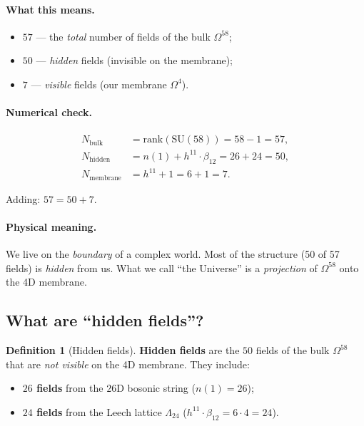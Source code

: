 \documentclass[11pt,a4paper]{article}
\newcommand{\SU}{\mathrm{SU}}
\newcommand{\Om}{\Omega^4}
\newcommand{\Omfi}{\Omega^{58}}
\newcommand{\Nbulk}{N_{\text{bulk}}}
\newcommand{\Nhidden}{N_{\text{hidden}}}
\newcommand{\Nmembrane}{N_{\text{membrane}}}
\theoremstyle{definition}
\newtheorem{definition}[theorem]{Definition}
\begin{document}
\paragraph{What this means.}
\begin{itemize}
    \item $57$ — the \emph{total} number of fields of the bulk $\Omfi$;
    \item $50$ — \emph{hidden} fields (invisible on the membrane);
    \item $7$ — \emph{visible} fields (our membrane $\Om$).
\end{itemize}

\paragraph{Numerical check.}
\begin{align}
    \Nbulk &= \mathrm{rank}(\SU(58)) = 58 - 1 = 57, \\
    \Nhidden &= n(1) + h^{11} \cdot \beta_{12} = 26 + 24 = 50, \\
    \Nmembrane &= h^{11} + 1 = 6 + 1 = 7.
\end{align}

Adding: $57 = 50 + 7$. \checkmark

\paragraph{Physical meaning.}
We live on the \emph{boundary} of a complex world. Most of the 
structure (50 of 57 fields) is \emph{hidden} from us. What we 
call ``the Universe'' is a \emph{projection} of $\Omfi$ onto 
the 4D membrane.

\subsection{What are ``hidden fields''?}
\label{subsec:hidden-fields}

\begin{definition}[Hidden fields]
\label{def:hidden-fields}
\textbf{Hidden fields} are the $50$ fields of the bulk $\Omfi$ that 
are \emph{not visible} on the 4D membrane. They include:
\begin{itemize}
    \item \textbf{$26$ fields} from the $26$D bosonic string 
          ($n(1) = 26$);
    \item \textbf{$24$ fields} from the Leech lattice $\Lambda_{24}$ 
          ($h^{11} \cdot \beta_{12} = 6 \cdot 4 = 24$).
\end{itemize}
\end{definition}
\end{document}
